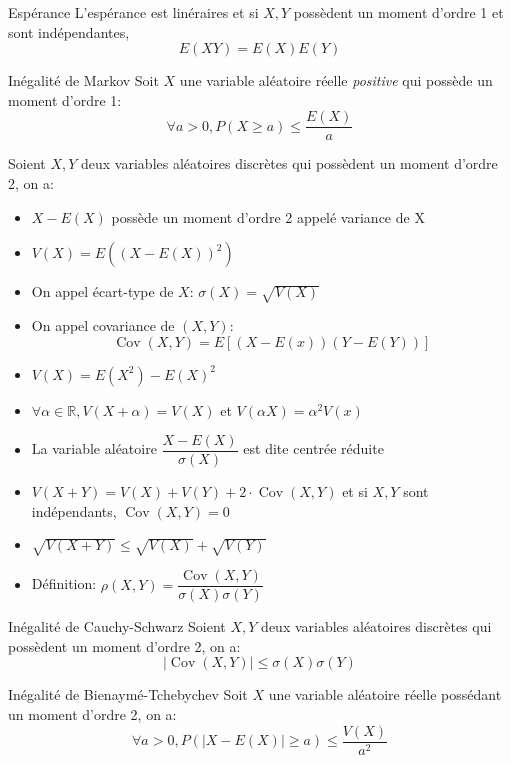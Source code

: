 \documentclass[french, a4paper, 10pt, twocolumn]{article}
\newcommand{\R}{\mathbb{R}}   %
\DeclareMathOperator{\cov}{Cov}
\begin{document}
\begin{theoreme}{Espérance}
  L'espérance est linéraires et si \(X,Y\) possèdent un moment d'ordre 1 et sont indépendantes,
  \[E(XY)=E(X)E(Y)\]
\end{theoreme}

\begin{theoreme}{Inégalité de Markov}
  Soit $X$ une variable aléatoire réelle \emph{positive} qui possède un moment d'ordre 1:
  \[\forall a>0, {P(X\geqslant a)\leqslant \frac{E(X)}{a}}\]
\end{theoreme}

\begin{definition}
  Soient \(X,Y\) deux variables aléatoires discrètes qui possèdent un moment d'ordre 2, on a:
  \begin{itemize}[label=\(\bullet\)]
    \item \(X-E(X)\) possède un moment d'ordre 2 appelé variance de X
    \item \(V(X)=E\left({(X-E(X))}^2\right)\)
    \item On appel écart-type de \(X\): \(\sigma(X)=\sqrt{V(X)}\)
    \item On appel covariance de \((X,Y)\): \[\cov(X,Y)=E\left[(X-E(x))(Y-E(Y))\right]\]
  \end{itemize}
  \tcblower
  \begin{itemize}
    \item \(V(X)=E(X^2)-{E(X)}^2\)
    \item \(\forall \alpha \in \R, V(X+\alpha)=V(X)\) et \(V(\alpha X)=\alpha^2V(x)\)
    \item La variable aléatoire \(\dfrac{X-E(X)}{\sigma(X)}\) est dite centrée réduite
    \item \(V(X+Y)=V(X)+V(Y)+2\cdot\cov(X,Y)\) et si \(X,Y\) sont indépendants, \(\cov(X,Y)=0\)
    \item \(\sqrt{V(X+Y)}\leqslant \sqrt{V(X)}+\sqrt{V(Y)}\)
    \item Définition: \(\rho(X,Y)=\dfrac{\cov(X,Y)}{\sigma(X)\sigma(Y)}\)
  \end{itemize}
\end{definition}

\begin{theoreme}{Inégalité de Cauchy-Schwarz}
  Soient \(X,Y\) deux variables aléatoires discrètes qui possèdent un moment d'ordre 2, on a:
  \[\left\lvert\cov(X,Y)\right\rvert \leqslant \sigma(X)\sigma(Y)\]
\end{theoreme}

\begin{theoreme}{Inégalité de Bienaymé-Tchebychev}
  Soit $X$ une variable aléatoire réelle possédant un moment d'ordre 2, on a:
  \[\forall a>0, P\left(|X-E(X)|\geqslant a\right)\leqslant \frac{V(X)}{a^2}\]
\end{theoreme}
\end{document}
